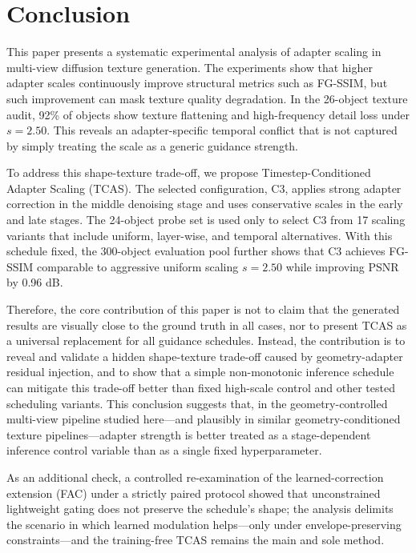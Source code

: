 \documentclass[times,twocolumn,final]{elsarticle}
\begin{document}
\section{Conclusion}
\label{sec:conclusion}

This paper presents a systematic experimental analysis of adapter scaling in multi-view diffusion texture generation. The experiments show that higher adapter scales continuously improve structural metrics such as FG-SSIM, but such improvement can mask texture quality degradation. In the 26-object texture audit, 92\% of objects show texture flattening and high-frequency detail loss under $s = 2.50$. This reveals an adapter-specific temporal conflict that is not captured by simply treating the scale as a generic guidance strength.

To address this shape-texture trade-off, we propose Timestep-Conditioned Adapter Scaling (TCAS). The selected configuration, C3, applies strong adapter correction in the middle denoising stage and uses conservative scales in the early and late stages. The 24-object probe set is used only to select C3 from 17 scaling variants that include uniform, layer-wise, and temporal alternatives. With this schedule fixed, the 300-object evaluation pool further shows that C3 achieves FG-SSIM comparable to aggressive uniform scaling $s = 2.50$ while improving PSNR by 0.96 dB.

Therefore, the core contribution of this paper is not to claim that the generated results are visually close to the ground truth in all cases, nor to present TCAS as a universal replacement for all guidance schedules. Instead, the contribution is to reveal and validate a hidden shape-texture trade-off caused by geometry-adapter residual injection, and to show that a simple non-monotonic inference schedule can mitigate this trade-off better than fixed high-scale control and other tested scheduling variants. This conclusion suggests that, in the geometry-controlled multi-view pipeline studied here---and plausibly in similar geometry-conditioned texture pipelines---adapter strength is better treated as a stage-dependent inference control variable than as a single fixed hyperparameter.

As an additional check, a controlled re-examination of the learned-correction extension (FAC) under a strictly paired protocol showed that unconstrained lightweight gating does not preserve the schedule's shape; the analysis delimits the scenario in which learned modulation helps---only under envelope-preserving constraints---and the training-free TCAS remains the main and sole method.
\end{document}
